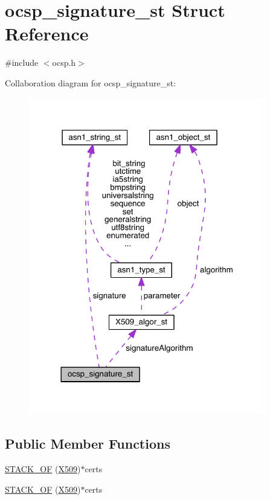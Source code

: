 \hypertarget{structocsp__signature__st}{}\section{ocsp\+\_\+signature\+\_\+st Struct Reference}
\label{structocsp__signature__st}


{\ttfamily \#include $<$ocsp.\+h$>$}



Collaboration diagram for ocsp\+\_\+signature\+\_\+st\+:\nopagebreak
\begin{figure}[H]
\begin{center}
\leavevmode
\includegraphics[width=293pt]{structocsp__signature__st__coll__graph}
\end{center}
\end{figure}
\subsection*{Public Member Functions}
\begin{DoxyCompactItemize}
\item 
\hyperlink{structocsp__signature__st_a51f0ddafb33cce3c0ce72817d32f1baa}{S\+T\+A\+C\+K\+\_\+\+OF} (\hyperlink{crypto_2ossl__typ_8h_a4f666bde6518f95deb3050c54b408416}{X509})$\ast$certs
\item 
\hyperlink{structocsp__signature__st_a51f0ddafb33cce3c0ce72817d32f1baa}{S\+T\+A\+C\+K\+\_\+\+OF} (\hyperlink{crypto_2ossl__typ_8h_a4f666bde6518f95deb3050c54b408416}{X509})$\ast$certs
\end{DoxyCompactItemize}
